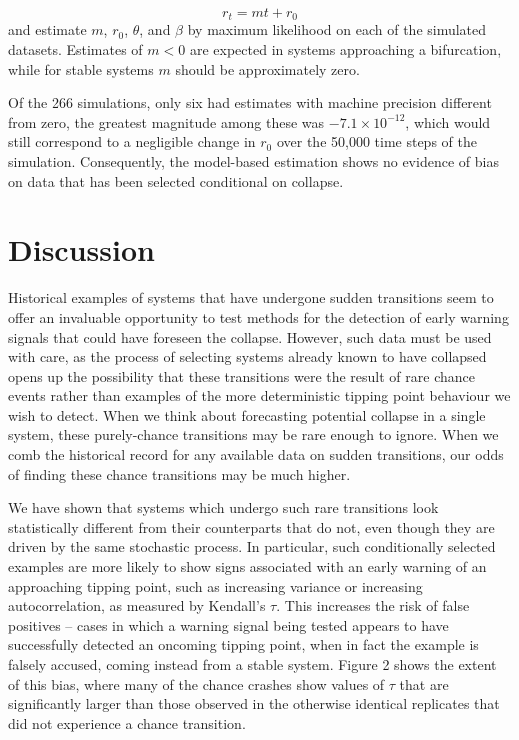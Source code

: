 \documentclass[authoryear,review,12pt]{elsarticle}
\begin{document}
\begin{equation}
 r_t = m t + r_0 
\end{equation}
and estimate $m$, $r_0$, $\theta$, and $\beta$ by maximum likelihood on each
of the simulated datasets.  Estimates of $m < 0 $ are expected in systems 
approaching a bifurcation, while for stable systems $m$ should be approximately zero.


Of the 266 simulations, only six had estimates with machine precision different
from zero, the greatest magnitude among these was $-7.1 \times 10^{-12}$,
which would still correspond to a negligible change in $r_0$ over the 50,000 time steps
of the simulation.  Consequently, the model-based estimation shows no 
evidence of bias on data that has been selected conditional on collapse.   



\section{Discussion}

Historical examples of systems that have undergone sudden transitions seem
to offer an invaluable opportunity to test methods for the detection of
early warning signals that could have foreseen the collapse.  However,
such data must be used with care, as the process of selecting systems
already known to have collapsed opens up the possibility that these
transitions were the result of rare chance events rather than examples
of the more deterministic tipping point behaviour we wish to detect.
When we think about forecasting potential collapse in a single system,
these purely-chance transitions may be rare enough to ignore.  When we
comb the historical record for any available data on sudden transitions,
our odds of finding these chance transitions may be much higher.

We have shown that systems which undergo such rare transitions look
statistically different from their counterparts that do not, even though
they are driven by the same stochastic process.  In particular, such
conditionally selected examples are more likely to show signs associated
with an early warning of an approaching tipping point, such as increasing
variance or increasing autocorrelation, as measured by Kendall's $\tau$.
This increases the risk of false positives -- cases in which a warning
signal being tested appears to have successfully detected an oncoming
tipping point, when in fact the example is falsely accused, coming
instead from a stable system. Figure 2 shows the extent of this bias,
where many of the chance crashes show values of $\tau$ that are 
significantly larger than those observed in the otherwise identical
replicates that did not experience a chance transition.  
\end{document}
